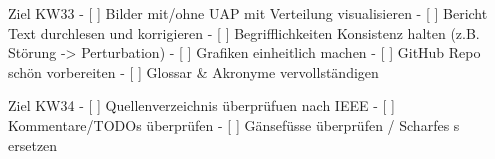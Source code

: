 Ziel KW33
- [ ] Bilder mit/ohne UAP mit Verteilung visualisieren
- [ ] Bericht Text durchlesen und korrigieren
- [ ] Begrifflichkeiten Konsistenz halten (z.B. Störung -> Perturbation)
- [ ] Grafiken einheitlich machen
- [ ] GitHub Repo schön vorbereiten
- [ ] Glossar \& Akronyme vervollständigen

Ziel KW34
- [ ] Quellenverzeichnis überprüfuen nach IEEE
- [ ] Kommentare/TODOs überprüfen
- [ ] Gänsefüsse überprüfen / Scharfes s ersetzen
